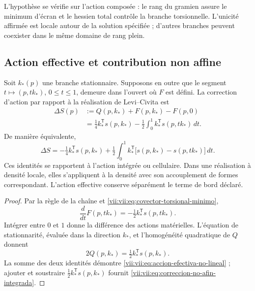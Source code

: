 L'hypothèse se vérifie sur l'action composée : le rang du
gramien assure le minimum d'écran et le hessien total contrôle
la branche torsionnelle. L'unicité affirmée est locale autour de la
solution spécifiée ; d'autres branches peuvent coexister dans le même
domaine de rang plein.

\subsection{Action effective et contribution non affine}
\label{vii:vii:subsec:accion-efectiva-no-afin}

\begin{theorem}
\label{vii:vii:thm:eliminacion-torsional-no-lineal}
Soit \(k_*(p)\) une branche stationnaire. Supposons en outre que le
segment \(t\mapsto (p,tk_*)\), \(0\leq t\leq1\), demeure
dans l'ouvert où \(F\) est défini. La correction d'action
par rapport à la réalisation de Levi--Civita est
\begin{equation}
 \begin{split}
 \Delta S(p)
  &:=Q(p,k_*)+F(p,k_*)-F(p,0)\\
  &=\tfrac14 k_*^{\mathsf T}s(p,k_*)
     -\tfrac12\int_0^1
           k_*^{\mathsf T}s(p,tk_*)\,dt.
 \end{split}
 \label{vii:vii:eq:accion-efectiva-no-lineal}
\end{equation}
De manière équivalente,
\begin{equation}
 \Delta S=-\tfrac14 k_*^{\mathsf T}s(p,k_*)
  +\tfrac12\int_0^1 k_*^{\mathsf T}
       \bigl[s(p,k_*)-s(p,tk_*)\bigr]\,dt.
 \label{vii:vii:eq:correccion-no-afin-integrada}
\end{equation}
Ces identités se rapportent à l'action intégrée ou cellulaire. Dans une réalisation à densité locale, elles s'appliquent à la densité avec son accouplement de formes correspondant. L'action effective conserve séparément le terme de bord déclaré.
\end{theorem}

\begin{proof}
Par la règle de la chaîne et
\eqref{vii:vii:eq:covector-torsional-minimo},
\[
 \frac{d}{dt}F(p,tk_*)
      =-\tfrac12 k_*^{\mathsf T}s(p,tk_*).
\]
Intégrer entre \(0\) et \(1\) donne la différence des actions
matérielles. L'équation de stationnarité, évaluée dans la
direction \(k_*\), et l'homogénéité quadratique de \(Q\) donnent
\[
 2Q(p,k_*)=\tfrac12 k_*^{\mathsf T}s(p,k_*).
\]
La somme des deux identités démontre
\eqref{vii:vii:eq:accion-efectiva-no-lineal} ; ajouter et soustraire
\(\tfrac12k_*^{\mathsf T}s(p,k_*)\) fournit
\eqref{vii:vii:eq:correccion-no-afin-integrada}.
\end{proof}

